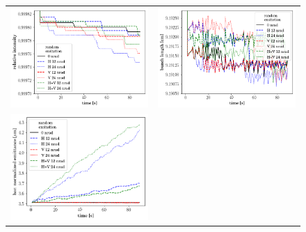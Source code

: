 \documentclass[aps
,prstab
,reprint
,longbibliography
,preprintnumbers
,showkeys
,amsfonts,amssymb,amsmath
,floatfix
]{revtex4-1}
\newlength{\halfwidth}
\begin{document}
\begin{figure}
  \begin{tabular}{cc}
    \includegraphics[width=\halfwidth]{2017injerra2b2u_ranadt_3_5um_intensity.png} &
    \includegraphics[width=\halfwidth]{2017injerra2b2u_ranadt_3_5um_sigm.png}\\
    \includegraphics[width=\halfwidth]{2017injerra2b2u_ranadt_3_5um_emit1.png} &

\end{tabular}
\end{figure}
\end{document}
